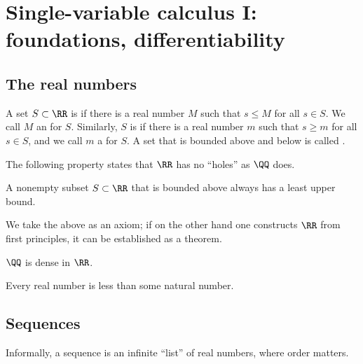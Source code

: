 
\section{{\color{violet}Single-variable calculus I}: foundations, differentiability}


\subsection{The real numbers}


\begin{definition}
A set $S \subset \RR$ is  if there is a real number $M$ such that $s \leq M$ for all $s \in S$. We call $M$ an  for $S$. Similarly, $S$ is  if there is a real number $m$ such that $s \geq m$ for all $s \in S$, and we call $m$ a  for $S$. A set that is bounded above and below is called .
\end{definition}

The following property states that $\RR$ has no ``holes'' as $\QQ$ does.

\begin{remark}
A nonempty subset $S \subset \RR$ that is bounded above always has a least upper bound.
\end{remark}

We take the above as an axiom; if on the other hand one constructs $\RR$ from first principles, it can be established as a theorem.

\begin{remark}
$\QQ$ is dense in $\RR$.
\end{remark}

\begin{remark}
Every real number is less than some natural number.
\end{remark}

\subsection{Sequences}

Informally, a sequence is an infinite ``list'' of real numbers, where order matters.

